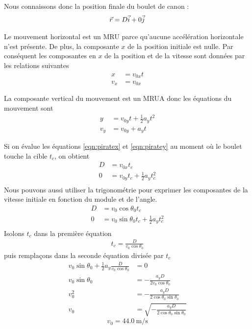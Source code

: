 \documentclass{tufte-handout}
\begin{document}
Nous connaissons donc la position finale du boulet de canon :
\[
  \vec{r} = D\vec{i} + 0\vec{j}
\]

Le mouvement horizontal est un MRU parce qu'aucune accélération horizontale
n'est présente.  De plus, la composante $x$ de la position initiale est nulle.
Par conséquent les composantes en $x$ de la position et de la vitesse sont
données par les relations suivantes
\begin{align}
  x   &= v_{0x} t \label{eqn:piratex} \\
  v_x &= v_{0x} \label{eqn:piratevx}
\end{align}

La composante vertical du mouvement est un MRUA donc les équations du mouvement
sont
\begin{align}
  y   &= v_{0y} t + \frac{1}{2} a_y t^2 \label{eqn:piratey} \\
  v_y &= v_{0y} + a_y t \label{eqn:piratevy}
\end{align}

Si on évalue les équations \ref{eqn:piratex} et \ref{eqn:piratey} au moment où
le boulet touche la cible $t_c$, on obtient
\begin{align*}
  D &= v_{0x}t_c \\
  0 &= v_{0y} t_c + \frac{1}{2} a_y t_c^2 \\
\end{align*}
Nous pouvons aussi utiliser la trigonométrie pour exprimer les composantes de
la vitesse initiale en fonction du module et de l'angle.
\begin{align*}
  D &= v_{0}\cos\theta_0 t_c \\
  0 &= v_{0}\sin\theta_0 t_c + \frac{1}{2} a_y t_c^2 \\
\end{align*}
Isolons $t_c$ dans la première équation
\begin{align*}
  t_c = \frac{D}{v_0\cos\theta_0} 
\end{align*}
puis remplaçons dans la seconde équation divisée par $t_c$
\begin{align*}
  v_0 \sin\theta_0 + \frac{1}{2} a_y \frac{D}{v_0\cos\theta_0} &= 0 \\
  v_0 \sin\theta_0 &= -\frac{a_y D}{2v_0 \cos\theta_0} \\
  v_0^2 &= -\frac{a_y D}{2\cos\theta_0\sin\theta_0} \\
  v_0 &= \sqrt{-\frac{a_y D}{2\cos\theta_0\sin\theta_0}}
\end{align*}
\[
  \boxed{v_0 = \SI{44.0}{\meter\per\second}}
\]
\end{document}
